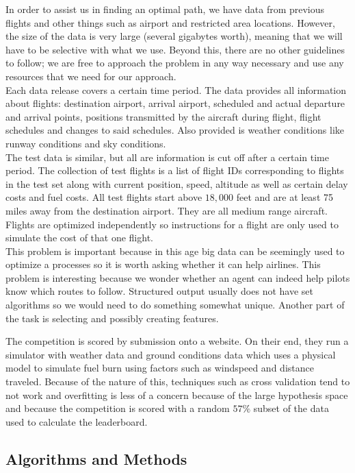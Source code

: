 \documentclass{article}[12pt]
\begin{document}
\begin{multicols}{2}
In order to assist us in finding an optimal path, we have data from previous flights and other things such as airport and restricted area locations. However, the size of the data is very large (several gigabytes worth), meaning that we will have to be selective with what we use. Beyond this, there are no other guidelines to follow; we are free to approach the problem in any way necessary and use any resources that we need for our approach.\\
Each data release covers a certain time period. The data provides all information about flights: destination airport, arrival airport, scheduled and actual departure and arrival points, positions transmitted by the aircraft during flight, flight schedules and changes to said schedules. Also provided is weather conditions like runway conditions and sky conditions. \\
The test data is similar, but all are information is cut off after a certain time period. The collection of test flights is a list of flight IDs corresponding to flights in the test set along with current position, speed, altitude as well as certain delay costs and fuel costs. All test flights start above $18,000$ feet and are at least 75 miles away from the destination airport. They are all medium range aircraft. Flights are optimized independently so instructions for a flight are only used to simulate the cost of that one flight. \\
This problem is important because in this age big data can be seemingly used to optimize a processes so it is worth asking whether it can help airlines. This problem is interesting because we wonder whether an agent can indeed help pilots know which routes to follow. Structured output usually does not have set algorithms so we would need to do something somewhat unique. Another part of the task is selecting and possibly creating features. 

The competition is scored by submission onto a website. On their end, they run a simulator with weather data and ground conditions data which uses a physical model to simulate fuel burn using factors such as windspeed and distance traveled. Because of the nature of this, techniques such as cross validation tend to not work and overfitting is less of a concern because of the large hypothesis space and because the competition is scored with a random $57\%$ subset of the data used to calculate the leaderboard.
\subsection{Algorithms and Methods}


\end{multicols}
\end{document}
